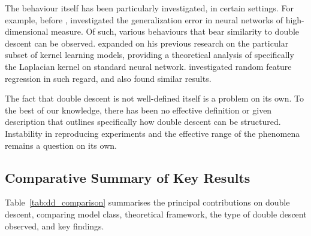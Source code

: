 \documentclass[
  journal=largetwo,
  year=2025,
  volume=37,
]{cup-journal}
\begin{document}
The behaviour itself has been particularly investigated, in certain settings. For example, before \cite{belkin_reconciling_2019}, \cite{advani2017highdimensionaldynamicsgeneralizationerror} investigated the generalization error in neural networks of high-dimensional measure. Of such, various behaviours that bear similarity to double descent can be observed. \cite{belkin2018understanddeeplearningneed} expanded on his previous research on the particular subset of kernel learning models, providing a theoretical analysis of specifically the Laplacian kernel on standard neural network. \cite{mei2020generalizationerrorrandomfeatures} investigated random feature regression in such regard, and also found similar results. 

The fact that double descent is not well-defined itself is a problem on its own. To the best of our knowledge, there has been no effective definition or given description that outlines specifically how double descent can be structured. Instability in reproducing experiments and the effective range of the phenomena remains a question on its own. 

\subsection{Comparative Summary of Key Results}

Table~\ref{tab:dd_comparison} summarises the principal contributions on double descent, comparing model class, theoretical framework, the type of double descent observed, and key findings.
\end{document}
